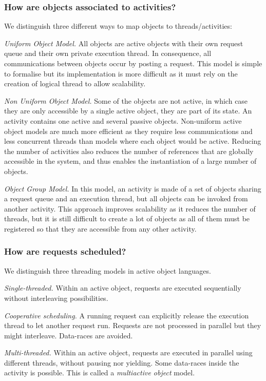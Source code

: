 \subsubsection{How are objects associated to activities?}\label{sec:activity}
We distinguish three different ways to map objects to threads/activities: 
\begin{description}
\item \textit{Uniform Object Model.}  All objects are active objects
  with their own request queue and their own private execution thread.
  In consequence, all communications between objects occur by posting
  a request. This model is simple to formalise but its implementation
  is more difficult as it must rely on the creation of logical thread
  to allow scalability.
\item \textit{Non Uniform Object Model.}  Some of the objects are not
  active, in which case they are only accessible by a single active
  object, they are part of its state. 
An activity contains one active and several passive objects.
Non-uniform active object models
  are much more efficient as they require less communications and
  less concurrent threads than models where each object would be
  active. Reducing the number of activities also reduces the number of
  references that are globally accessible in the system, and thus enables the
  instantiation of a large number of objects.
\item \textit{Object Group Model.}
In this model, an activity is made of a set of objects sharing a
request queue and an execution thread, but all
objects can be invoked from another activity. This
approach improves scalability as it reduces the number of threads, but
it is still difficult to create a lot of objects as all of them must
be registered so that they are accessible from any other activity.
\end{description}

\subsubsection{How are requests scheduled?}
We distinguish three  threading models in active object languages.
\begin{description}
\item \textit{Single-threaded.} 
Within an active object, requests are executed sequentially without
interleaving possibilities. 
\item \textit{Cooperative scheduling.}
A running request can explicitly release the execution thread to let
another request run. Requests are not processed in parallel but they
might interleave. Data-races are avoided.
\item \textit{Multi-threaded.}
Within an active object, requests are executed in parallel using
different threads, without pausing nor yielding.
Some data-races inside the activity is possible. This is
called a \emph{multiactive object} model.
\end{description}

